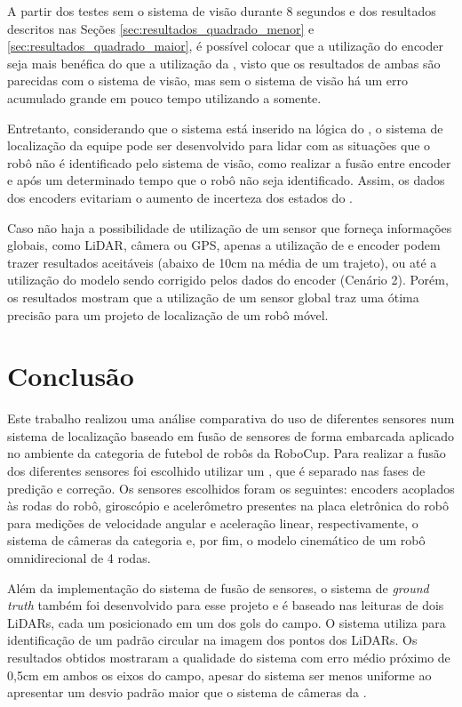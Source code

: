 \documentclass[acronym, symbols, table]{fei}
\begin{document}
		A partir dos testes sem o sistema de visão durante 8 segundos e dos resultados descritos nas Seções \ref{sec:resultados_quadrado_menor} e \ref{sec:resultados_quadrado_maior}, é possível colocar que a utilização do encoder seja mais benéfica do que a utilização da , visto que os resultados de ambas são parecidas com o sistema de visão, mas sem o sistema de visão há um erro acumulado grande em pouco tempo utilizando a  somente. 
		
		Entretanto, considerando que o sistema está inserido na lógica do , o sistema de localização da equipe pode ser desenvolvido para lidar com as situações que o robô não é identificado pelo sistema de visão, como realizar a fusão entre encoder e  após um determinado tempo que o robô não seja identificado. Assim, os dados dos encoders evitariam o aumento de incerteza dos estados do . 
		
		Caso não haja a possibilidade de utilização de um sensor que forneça informações globais, como LiDAR, câmera ou GPS, apenas a utilização de  e encoder podem trazer resultados aceitáveis (abaixo de 10cm na média de um trajeto), ou até a utilização do modelo sendo corrigido pelos dados do encoder (Cenário 2). Porém, os resultados mostram que a utilização de um sensor global traz uma ótima precisão para um projeto de localização de um robô móvel.

\chapter{Conclusão} \label{sec:conclusao}

	Este trabalho realizou uma análise comparativa do uso de diferentes sensores num sistema de localização baseado em fusão de sensores de forma embarcada aplicado no ambiente da categoria  de futebol de robôs da RoboCup. Para realizar a fusão dos diferentes sensores foi escolhido utilizar um , que é separado nas fases de predição e correção. Os sensores escolhidos foram os seguintes: encoders acoplados às rodas do robô, giroscópio e acelerômetro presentes na placa eletrônica do robô para medições de velocidade angular e aceleração linear, respectivamente, o sistema de câmeras da categoria  e, por fim, o modelo cinemático de um robô omnidirecional de 4 rodas.
	
	Além da implementação do sistema de fusão de sensores, o sistema de \textit{ground truth} também foi desenvolvido para esse projeto e é baseado nas leituras de dois LiDARs, cada um posicionado em um dos gols do campo. O sistema utiliza  para identificação de um padrão circular na imagem dos pontos dos LiDARs. Os resultados obtidos mostraram a qualidade do sistema com erro médio próximo de 0,5cm em ambos os eixos do campo, apesar do sistema ser menos uniforme ao apresentar um desvio padrão maior que o sistema de câmeras da .
	
\end{document}
